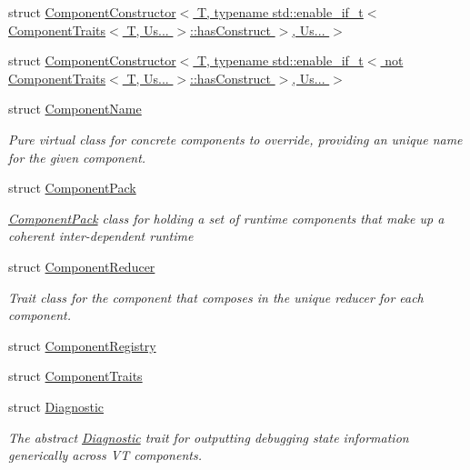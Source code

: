 \begin{DoxyCompactItemize}
struct \hyperlink{structvt_1_1runtime_1_1component_1_1_component_constructor_3_01_t_00_01typename_01std_1_1enable_dedfd2c3ef69e6a47f9b0ae4add8a2c2}{Component\+Constructor$<$ T, typename std\+::enable\+\_\+if\+\_\+t$<$ Component\+Traits$<$ T, Us... $>$\+::has\+Construct $>$, Us... $>$}
\item 
struct \hyperlink{structvt_1_1runtime_1_1component_1_1_component_constructor_3_01_t_00_01typename_01std_1_1enable_d276515b5a7f9fcbeb633c90b56fc1b0}{Component\+Constructor$<$ T, typename std\+::enable\+\_\+if\+\_\+t$<$ not Component\+Traits$<$ T, Us... $>$\+::has\+Construct $>$, Us... $>$}
\item 
struct \hyperlink{structvt_1_1runtime_1_1component_1_1_component_name}{Component\+Name}
\begin{DoxyCompactList}\small\item\em Pure virtual class for concrete components to override, providing an unique name for the given component. \end{DoxyCompactList}\item 
struct \hyperlink{structvt_1_1runtime_1_1component_1_1_component_pack}{Component\+Pack}
\begin{DoxyCompactList}\small\item\em {\ttfamily \hyperlink{structvt_1_1runtime_1_1component_1_1_component_pack}{Component\+Pack}} class for holding a set of runtime components that make up a coherent inter-\/dependent runtime \end{DoxyCompactList}\item 
struct \hyperlink{structvt_1_1runtime_1_1component_1_1_component_reducer}{Component\+Reducer}
\begin{DoxyCompactList}\small\item\em Trait class for the component that composes in the unique reducer for each component. \end{DoxyCompactList}\item 
struct \hyperlink{structvt_1_1runtime_1_1component_1_1_component_registry}{Component\+Registry}
\item 
struct \hyperlink{structvt_1_1runtime_1_1component_1_1_component_traits}{Component\+Traits}
\item 
struct \hyperlink{structvt_1_1runtime_1_1component_1_1_diagnostic}{Diagnostic}
\begin{DoxyCompactList}\small\item\em The abstract {\ttfamily \hyperlink{structvt_1_1runtime_1_1component_1_1_diagnostic}{Diagnostic}} trait for outputting debugging state information generically across VT components. \end{DoxyCompactList}\item 

\end{DoxyCompactItemize}
